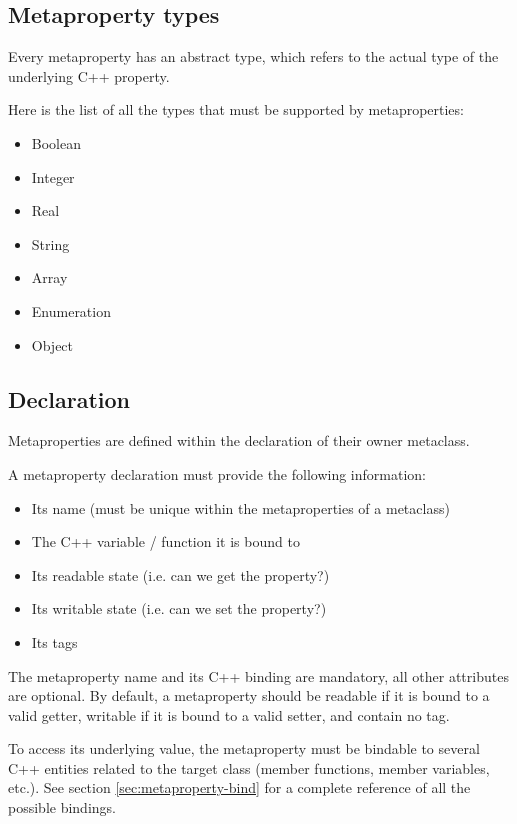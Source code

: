 \documentclass[a4paper, twoside]{report}
\begin{document}
\subsection{Metaproperty types}
\label{sec:metaproperty-types}

	Every metaproperty has an abstract type, which refers to the actual type of the underlying
	C++ property.

	Here is the list of all the types that must be supported by metaproperties:

	\begin{itemize}
		\item Boolean
		\item Integer
		\item Real
		\item String
		\item Array
		\item Enumeration
		\item Object
	\end{itemize}

\subsection{Declaration}

	Metaproperties are defined within the declaration of their owner metaclass.
	
	A metaproperty declaration must provide the following information:
	
	\begin{itemize}
		\item Its name (must be unique within the metaproperties of a metaclass)
		\item The C++ variable / function it is bound to
		\item Its readable state (i.e. can we get the property?)
		\item Its writable state (i.e. can we set the property?)
		\item Its tags
	\end{itemize}
	
	The metaproperty name and its C++ binding are mandatory, all other attributes are optional. By default,
	a metaproperty should be readable if it is bound to a valid getter, writable if it is bound to a
	valid setter, and contain no tag.
	
	To access its underlying value, the metaproperty must be bindable to several C++ entities related to the target class
	(member functions, member variables, etc.). See section \ref{sec:metaproperty-bind} for a complete reference
	of all the possible bindings.
\end{document}

